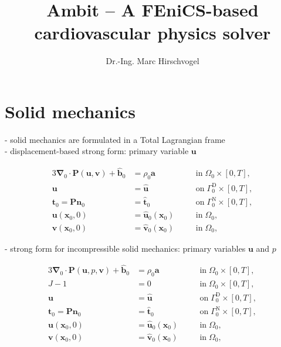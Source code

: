 \documentclass[a4paper,12pt]{report}
\newcommand{\bs}[1]{\boldsymbol{#1}}
\begin{document}
\title{Ambit -- A FEniCS-based cardiovascular physics solver}
\author{Dr.-Ing. Marc Hirschvogel}

\maketitle

\tableofcontents

\section{Solid mechanics}

- solid mechanics are formulated in a Total Lagrangian frame\\

- displacement-based strong form: primary variable $\bs{u}$

\begin{alignat}{3}
\bs{\nabla}_{0} \cdot \bs{P}(\bs{u},\bs{v}) + \hat{\bs{b}}_{0} &= \rho_{0} \bs{a} \quad &&\text{in} \; \mathit{\Omega}_{0} \times [0, T], \label{eq:divP} \\
\bs{u} &= \hat{\bs{u}} \quad &&\text{on} \; \mathit{\Gamma}_{0}^{\mathrm{D}} \times [0, T], \label{eq:bc_u}\\
\bs{t}_{0} = \bs{P}\bs{n}_{0} &= \hat{\bs{t}}_{0} \quad &&\text{on} \; \mathit{\Gamma}_{0}^{\mathrm{N}} \times [0, T], \label{eq:bc_N}\\
\bs{u}(\bs{x}_{0},0) &= \hat{\bs{u}}_{0}(\bs{x}_{0}) \quad &&\text{in} \; \mathit{\Omega}_{0}, \label{eq:ini_u}\\
\bs{v}(\bs{x}_{0},0) &= \hat{\bs{v}}_{0}(\bs{x}_{0}) \quad &&\text{in} \; \mathit{\Omega}_{0}, \label{eq:ini_v}
\end{alignat}

- strong form for incompressible solid mechanics: primary variables $\bs{u}$ and $p$

\begin{alignat}{3}
\bs{\nabla}_{0} \cdot \bs{P}(\bs{u},p,\bs{v}) + \hat{\bs{b}}_{0} &= \rho_{0} \bs{a} \quad &&\text{in} \; \mathit{\Omega}_{0} \times [0, T], \label{eq:divP} \\
J-1 &= 0 \quad &&\text{in} \; \mathit{\Omega}_{0} \times [0, T], \label{eq:J} \\
\bs{u} &= \hat{\bs{u}} \quad &&\text{on} \; \mathit{\Gamma}_{0}^{\mathrm{D}} \times [0, T], \label{eq:bc_u}\\
\bs{t}_{0} = \bs{P}\bs{n}_{0} &= \hat{\bs{t}}_{0} \quad &&\text{on} \; \mathit{\Gamma}_{0}^{\mathrm{N}} \times [0, T], \label{eq:bc_N}\\
\bs{u}(\bs{x}_{0},0) &= \hat{\bs{u}}_{0}(\bs{x}_{0}) \quad &&\text{in} \; \mathit{\Omega}_{0}, \label{eq:ini_u}\\
\bs{v}(\bs{x}_{0},0) &= \hat{\bs{v}}_{0}(\bs{x}_{0}) \quad &&\text{in} \; \mathit{\Omega}_{0}, \label{eq:ini_v}
\end{alignat}
\end{document}
